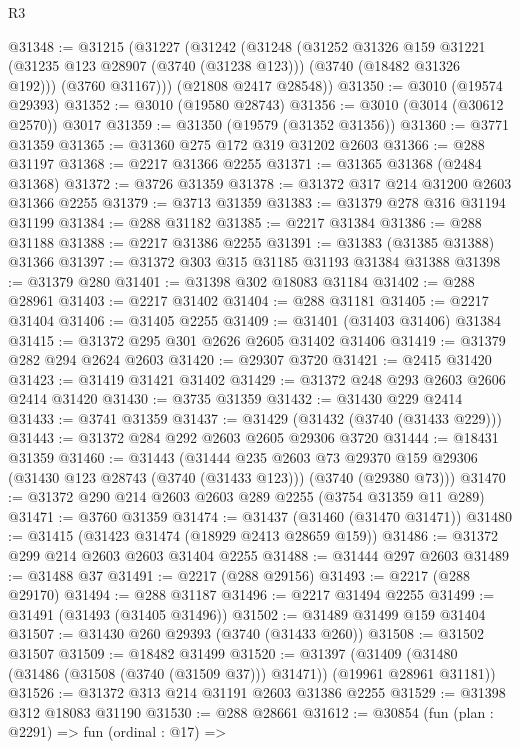 \begin{lexlean}{R3}
\begin{coremodule}
@31348 := @31215
    (@31227
      (@31242
        (@31248
          (@31252
            @31326
            @159
            @31221
            (@31235 @123 @28907 (@3740 (@31238 @123)))
            (@3740 (@18482 @31326 @192)))
          (@3760 @31167)))
      (@21808 @2417 @28548))
@31350 := @3010 (@19574 @29393)
@31352 := @3010 (@19580 @28743)
@31356 := @3010 (@3014 (@30612 @2570)) @3017
@31359 := @31350 (@19579 (@31352 @31356))
@31360 := @3771 @31359
@31365 := @31360 @275 @172 @319 @31202 @2603
@31366 := @288 @31197
@31368 := @2217 @31366 @2255
@31371 := @31365 @31368 (@2484 @31368)
@31372 := @3726 @31359
@31378 := @31372 @317 @214 @31200 @2603 @31366 @2255
@31379 := @3713 @31359
@31383 := @31379 @278 @316 @31194 @31199
@31384 := @288 @31182
@31385 := @2217 @31384
@31386 := @288 @31188
@31388 := @2217 @31386 @2255
@31391 := @31383 (@31385 @31388) @31366
@31397 := @31372 @303 @315 @31185 @31193 @31384 @31388
@31398 := @31379 @280
@31401 := @31398 @302 @18083 @31184
@31402 := @288 @28961
@31403 := @2217 @31402
@31404 := @288 @31181
@31405 := @2217 @31404
@31406 := @31405 @2255
@31409 := @31401 (@31403 @31406) @31384
@31415 := @31372 @295 @301 @2626 @2605 @31402 @31406
@31419 := @31379 @282 @294 @2624 @2603
@31420 := @29307 @3720
@31421 := @2415 @31420
@31423 := @31419 @31421 @31402
@31429 := @31372 @248 @293 @2603 @2606 @2414 @31420
@31430 := @3735 @31359
@31432 := @31430 @229 @2414
@31433 := @3741 @31359
@31437 := @31429 (@31432 (@3740 (@31433 @229)))
@31443 := @31372 @284 @292 @2603 @2605 @29306 @3720
@31444 := @18431 @31359
@31460 := @31443
    (@31444
      @235
      @2603
      @73
      @29370
      @159
      @29306
      (@31430 @123 @28743 (@3740 (@31433 @123)))
      (@3740 (@29380 @73)))
@31470 := @31372 @290 @214 @2603 @2603 @289 @2255 (@3754 @31359 @11 @289)
@31471 := @3760 @31359
@31474 := @31437 (@31460 (@31470 @31471))
@31480 := @31415 (@31423 @31474 (@18929 @2413 @28659 @159))
@31486 := @31372 @299 @214 @2603 @2603 @31404 @2255
@31488 := @31444 @297 @2603
@31489 := @31488 @37
@31491 := @2217 (@288 @29156)
@31493 := @2217 (@288 @29170)
@31494 := @288 @31187
@31496 := @2217 @31494 @2255
@31499 := @31491 (@31493 (@31405 @31496))
@31502 := @31489 @31499 @159 @31404
@31507 := @31430 @260 @29393 (@3740 (@31433 @260))
@31508 := @31502 @31507
@31509 := @18482 @31499
@31520 := @31397
    (@31409 (@31480 (@31486 (@31508 (@3740 (@31509 @37))) @31471)) (@19961 @28961 @31181))
@31526 := @31372 @313 @214 @31191 @2603 @31386 @2255
@31529 := @31398 @312 @18083 @31190
@31530 := @288 @28661
@31612 := @30854
    (fun (plan : @2291) =>
    fun (ordinal : @17) =>

\end{coremodule}
\end{lexlean}
